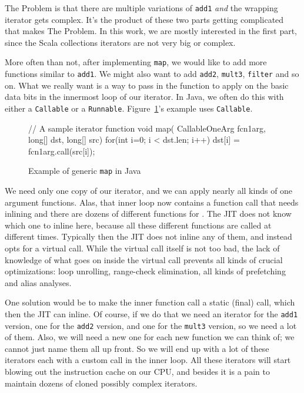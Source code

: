 The Problem is that there are multiple variations of \texttt{add1} \emph{and}
the wrapping iterator gets complex.  It's the product of these two parts getting
complicated that makes The Problem. In this work, we are mostly interested in
the first part, since the Scala collections iterators are not very big or
complex.

More often than not, after implementing \texttt{map}, we would like to add more
functions similar to \texttt{add1}. We might also want to add \texttt{add2}, \texttt{mult3},
\texttt{filter} and so on. What we really want is a way to pass in the function to
apply on the basic data bits in the innermost loop of our iterator. In Java, we often do this with either a \texttt{Callable} or a \texttt{Runnable}. Figure~\ref{java_generic_map}'s example uses \texttt{Callable}.

\begin{figure}
\begin{javaCode}
// A sample iterator function
void map( CallableOneArg fcn1arg, long[] dst, long[] src) {
  for(int i=0; i < dst.len; i++)
    dst[i] = fcn1arg.call(src[i]);
}
\end{javaCode}
\caption[Example of generic \texttt{map} in Java]{Example of generic \texttt{map} in Java}
\label{java_generic_map}
\end{figure}
  
We need only one copy of our iterator, and we can apply nearly all kinds of one
argument functions. Alas, that inner loop now contains a function call that
needs inlining and there are dozens of different functions for .
The JIT does not know which one to inline here, because all these different
functions are called at different times.  Typically then the JIT does not inline
any of them, and instead opts for a virtual call.  While the virtual call
itself is not too bad, the lack of knowledge of what goes on inside the virtual
call prevents all kinds of crucial optimizations: loop unrolling, range-check
elimination, all kinds of prefetching and alias analyses.

One solution  would be to make the inner function call a static (final)
call, which then the JIT can inline. Of course, if we do that we need an
iterator for the \texttt{add1} version, one for the \texttt{add2} version, and one for the
\texttt{mult3} version, so we need a lot of them. Also, we will need a new one for
each new function we can think of; we cannot just name them all up front.  So we
will end up with a lot of these iterators each with a custom call in the inner
loop. All these iterators will start blowing out the instruction cache on our
CPU, and besides it is a pain to maintain dozens of cloned possibly complex
iterators.

